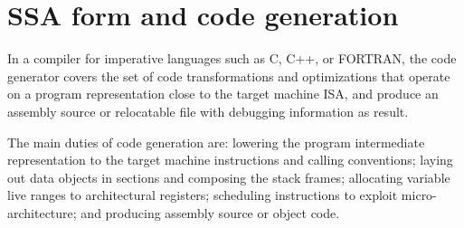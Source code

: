 \chapter{SSA form and code generation }
\label{chapter:ssa-codegen}

In a compiler for imperative languages such as C, C++, or FORTRAN, the code
generator covers the set of code transformations and optimizations that operate
on a program representation close to the target machine ISA, and produce an
assembly source or relocatable file with debugging information as result.

The main duties of code generation are: lowering the program intermediate
representation to the target machine instructions and calling conventions;
laying out data objects in sections and composing the stack frames; allocating
variable live ranges to architectural registers; scheduling instructions to
exploit micro-architecture; and producing assembly source or object code.

